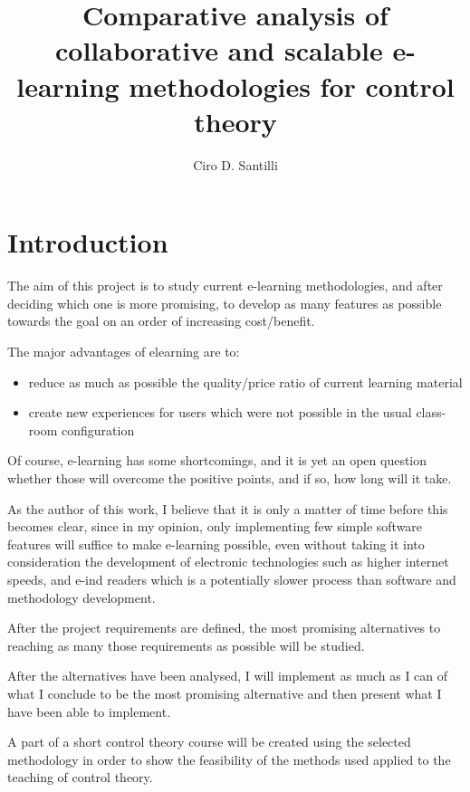 \documentclass[12pt]{article}
\title{Comparative analysis of collaborative and scalable e-learning methodologies for control theory}
\author{Ciro D. Santilli}
\begin{document}
\maketitle

\newpage

\tableofcontents

\newpage

\section{Introduction}

The aim of this project is to study current e-learning methodologies, and after deciding which one is more promising, to develop as many features as possible towards the goal on an order of increasing cost/benefit.

The major advantages of elearning are to:

\begin{itemize}
  \item reduce as much as possible the quality/price ratio of current learning material
  \item create new experiences for users which were not possible in the usual class-room configuration
\end{itemize}

Of course, e-learning has some shortcomings, and it is yet an open question whether those will overcome the positive points, and if so, how long will it take.

As the author of this work, I believe that it is only a matter of time before this becomes clear, since in my opinion, only implementing few simple software features will suffice to make e-learning possible, even without taking it into consideration the development of electronic technologies such as higher internet speeds, and e-ind readers which is a potentially slower process than software and methodology development.

After the project requirements are defined, the most promising alternatives to reaching as many those requirements as possible will be studied.

After the alternatives have been analysed, I will implement as much as I can of what I conclude to be the most promising alternative and then present what I have been able to implement.

A part of a short control theory course will be created using the selected methodology in order to show the feasibility of the methods used applied to the teaching of control theory.
\end{document}
